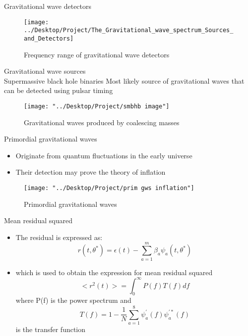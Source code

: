 \documentclass{beamer}
\begin{document}
\begin{frame}{Gravitational wave detectors}
\begin{figure}
	\centering
	\texttt{[image: ../Desktop/Project/The\_Gravitational\_wave\_spectrum\_Sources\_and\_Detectors]}
	\caption{Frequency range of gravitational wave detectors}
	\label{fig:thegravitationalwavespectrumsourcesanddetectors}
\end{figure}
\end{frame}

\begin{frame}{Gravitational wave sources\\Supermassive black hole binaries}
Most likely source of gravitational waves that can be detected using pulsar timing
\begin{figure}
	\centering
	\texttt{[image: "../Desktop/Project/smbhb image"]}
	\caption{Gravitational waves produced by coalescing masses}
	\label{fig:smbhb-image}
\end{figure}
\end{frame}

\begin{frame}{Primordial gravitational waves}
\begin{itemize}
	\item Originate from quantum fluctuations in the early universe 
	\item Their detection may prove the theory of inflation
\end{itemize}
\begin{figure}
	\centering
	\texttt{[image: "../Desktop/Project/prim gws inflation"]}
	\caption{Primordial gravitational waves}
	\label{fig:prim-gws-inflation}
\end{figure}
\end{frame}

\begin{frame}{Mean residual squared}
\begin{itemize}
	\item The residual is expressed as:
\begin{equation}\label{residual with beta}
r(t,\theta^*)=\epsilon(t)-\sum_{a=1}^{m}\beta_a \psi_a(t,\theta^*)%
\end{equation}
\item which is used to obtain the expression for mean residual squared
\begin{equation}
<r^{2}(t)>=\int_{0}^{\infty}P(f)T(f)df
\end{equation}
where P(f) is the power spectrum and $$T(f)=1-\frac{1}{N}\sum_{a=1}^{8}\psi_a^{'}(f)\psi_a^{'*}(f)$$ is the transfer function
\end{itemize}
\end{frame}
\end{document}

